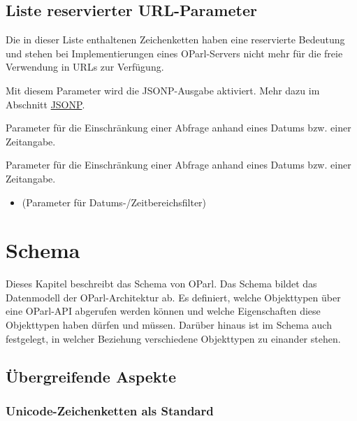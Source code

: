 \documentclass[,a4paper]{article}
\begin{document}
\subsection{Liste reservierter
URL-Parameter}\label{liste-reservierter-url-parameter}

Die in dieser Liste enthaltenen Zeichenketten haben eine reservierte
Bedeutung und stehen bei Implementierungen eines OParl-Servers nicht
mehr für die freie Verwendung in URLs zur Verfügung.

\begin{description}
\itemsep1pt\parskip0pt
\item[callback:]
Mit diesem Parameter wird die JSONP-Ausgabe aktiviert. Mehr dazu im
Abschnitt \hyperref[jsonp]{JSONP}.
\item[startdate:]
Parameter für die Einschränkung einer Abfrage anhand eines Datums bzw.
einer Zeitangabe.
\item[enddate:]
Parameter für die Einschränkung einer Abfrage anhand eines Datums bzw.
einer Zeitangabe.
\end{description}

\begin{itemize}
\itemsep1pt\parskip0pt
\item
  (Parameter für Datums-/Zeitbereichsfilter)
\end{itemize}

\section{Schema}\label{schema}

Dieses Kapitel beschreibt das Schema von OParl. Das Schema bildet das
Datenmodell der OParl-Architektur ab. Es definiert, welche Objekttypen
über eine OParl-API abgerufen werden können und welche Eigenschaften
diese Objekttypen haben dürfen und müssen. Darüber hinaus ist im Schema
auch festgelegt, in welcher Beziehung verschiedene Objekttypen zu
einander stehen.

\subsection{Übergreifende Aspekte}\label{uxfcbergreifende-aspekte}

\subsubsection{Unicode-Zeichenketten als
Standard}\label{unicode-zeichenketten-als-standard}
\end{document}
